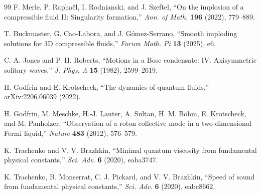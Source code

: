 \documentclass[11pt,a4paper]{article}
\begin{document}
\begin{thebibliography}{99}
  F. Merle, P. Rapha\"el, I. Rodnianski, and J. Szeftel,
  ``On the implosion of a compressible fluid II: Singularity formation,''
  \emph{Ann. of Math.} \textbf{196} (2022), 779--889.

  T. Buckmaster, G. Cao-Labora, and J. G\'omez-Serrano,
  ``Smooth imploding solutions for 3D compressible fluids,''
  \emph{Forum Math. Pi} \textbf{13} (2025), e6.

  C. A. Jones and P. H. Roberts,
  ``Motions in a Bose condensate: IV. Axisymmetric solitary waves,''
  \emph{J. Phys. A} \textbf{15} (1982), 2599--2619.

  H. Godfrin and E. Krotscheck,
  ``The dynamics of quantum fluids,'' arXiv:2206.06039 (2022).

  H. Godfrin, M. Meschke, H.-J. Lauter, A. Sultan, H. M. B\"ohm, E. Krotscheck, and M. Panholzer,
  ``Observation of a roton collective mode in a two-dimensional Fermi liquid,''
  \emph{Nature} \textbf{483} (2012), 576--579.

  K. Trachenko and V. V. Brazhkin,
  ``Minimal quantum viscosity from fundamental physical constants,''
  \emph{Sci. Adv.} \textbf{6} (2020), eaba3747.

  K. Trachenko, B. Monserrat, C. J. Pickard, and V. V. Brazhkin,
  ``Speed of sound from fundamental physical constants,''
  \emph{Sci. Adv.} \textbf{6} (2020), eabc8662.


\end{thebibliography}
\end{document}
